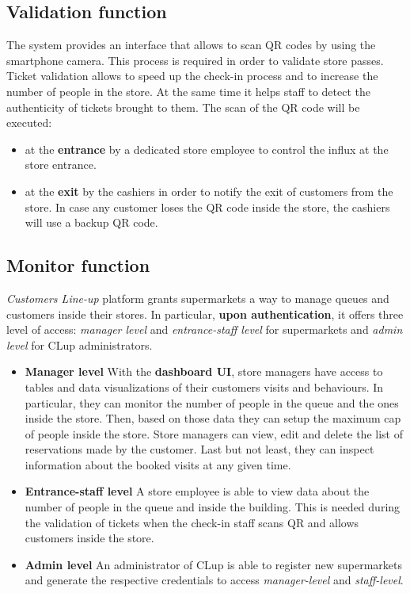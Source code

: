 \subsection{Validation function}
The system provides an interface that allows to scan QR codes by using the smartphone camera. This process is required in order to validate store passes.\newline
Ticket validation allows to speed up the check-in process and to increase the number of people in the store. At the same time it helps staff to detect the authenticity of tickets brought to them.\newline
The scan of the QR code will be executed:
\begin{itemize}
	\item at the \textbf{entrance} by a dedicated store employee to control the influx at the store entrance.
	\item at the \textbf{exit} by the cashiers in order to notify the exit of customers from the store. In case any customer loses the QR code inside the store, the cashiers will use a backup QR code.
\end{itemize}

\subsection{Monitor function}
\textit{Customers Line-up} platform grants supermarkets a way to manage queues and customers inside their stores. In particular, \textbf{upon authentication}, it offers three level of access: \textit{manager level} and \textit{entrance-staff level} for supermarkets and \textit{admin level} for CLup administrators.

\begin{itemize}
	\item \textbf{Manager level}\newline
	With the \textbf{dashboard UI}, store managers have access to tables and data visualizations of their customers visits and behaviours. In particular, they can monitor the number of people in the queue and the ones inside the store. Then, based on those data they can setup the maximum cap of people inside the store.\newline
	Store managers can view, edit and delete the list of reservations made by the customer.\newline
	Last but not least, they can inspect information about the booked visits at any given time.

	\item \textbf{Entrance-staff level}\newline
	A store employee is able to view data about the number of people in the queue and inside the building. This is needed during the validation of tickets when the check-in staff scans QR and allows customers inside the store.

    \item \textbf{Admin level}\newline
    An administrator of CLup is able to register new supermarkets and generate the respective credentials to access \textit{manager-level} and \textit{staff-level}.
\end{itemize}

